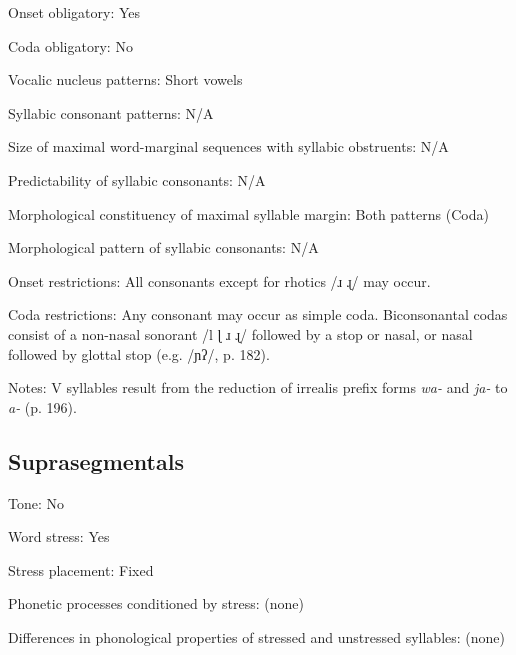 {\begin{appendixdesc}
\item[Onset obligatory:] Yes

\item[Coda obligatory:] No

\item[Vocalic nucleus patterns:] Short vowels

\item[Syllabic consonant patterns:] N/A

\item[Size of maximal word-marginal sequences with syllabic obstruents:] N/A

\item[Predictability of syllabic consonants:] N/A

\item[Morphological constituency of maximal syllable margin:] Both patterns (Coda)

\item[Morphological pattern of syllabic consonants:] N/A

\item[Onset restrictions:] All consonants except for rhotics /ɹ ɻ/ may occur.

\item[Coda restrictions:] Any consonant may occur as simple coda. Biconsonantal codas consist of a non-nasal sonorant /l ɭ ɹ ɻ/ followed by a stop or nasal, or nasal followed by glottal stop (e.g. /ɲʔ/, p. 182).

\item[Notes:] V syllables result from the reduction of irrealis prefix forms \textit{wa-} and \textit{ja-} to \textit{a-} (p. 196).
\end{appendixdesc}
\subsection*{Suprasegmentals}
\begin{appendixdesc}
\item[Tone:] No

\item[Word stress:] Yes

\item[Stress placement:] Fixed

\item[Phonetic processes conditioned by stress:] (none)

\item[Differences in phonological properties of stressed and unstressed syllables:] (none)


\end{appendixdesc}}
